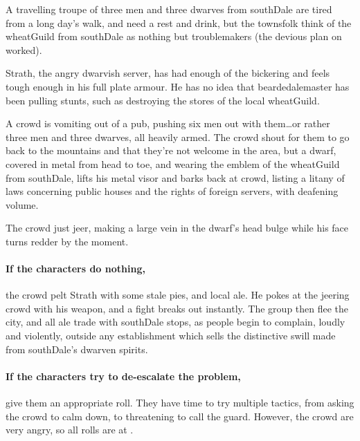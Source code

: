 A travelling troupe of three men and three dwarves from \gls{southDale} are tired from a long day's walk, and need a rest and drink, but the townsfolk think of the \gls{wheatGuild} from \gls{southDale} as nothing but troublemakers (the devious plan on  worked).

Strath, the angry dwarvish \gls{server}, has had enough of the bickering and feels tough enough in his full plate armour.
He has no idea that \gls{beardedalemaster} has been pulling stunts, such as destroying the stores of the local \gls{wheatGuild}.

\begin{boxtext}
  A crowd is vomiting out of a pub, pushing six men out with them\ldots or rather three men and three dwarves, all heavily armed.
  The crowd shout for them to go back to the mountains and that they're not welcome in the area, but a dwarf, covered in metal from head to toe, and wearing the emblem of the \gls{wheatGuild} from \gls{southDale}, lifts his metal visor and barks back at crowd, listing a litany of laws concerning public houses and the rights of foreign \glspl{server}, with deafening volume.

  The crowd just jeer, making a large vein in the dwarf's head bulge while his face turns redder by the moment.
\end{boxtext}

\paragraph{If the characters do nothing,}
the crowd pelt Strath with some stale pies, and local ale.
He pokes at the jeering crowd with his weapon, and a fight breaks out instantly.
The group then flee the city, and all ale trade with \gls{southDale} stops, as people begin to complain, loudly and violently, outside any establishment which sells the distinctive swill made from \gls{southDale}'s dwarven spirits.

\paragraph{If the characters try to de-escalate the problem,}
give them an appropriate roll.
They have time to try multiple tactics, from asking the crowd to calm down, to threatening to call the guard.
However, the crowd are very angry, so all rolls are at \tn[10].


